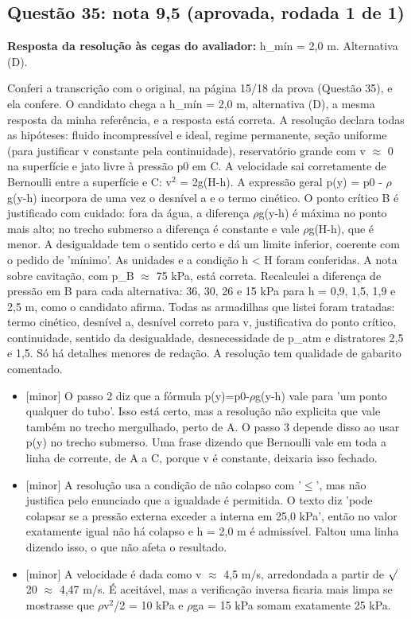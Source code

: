 \documentclass{article}%
\begin{document}
\subsection*{Questão 35: nota 9,5 (aprovada, rodada 1 de 1)}%
\textbf{Resposta da resolução às cegas do avaliador:} h\_mín = 2,0 m. Alternativa (D).\par %
Conferi a transcrição com o original, na página 15/18 da prova (Questão 35), e ela confere. O candidato chega a h\_mín = 2,0 m, alternativa (D), a mesma resposta da minha referência, e a resposta está correta. A resolução declara todas as hipóteses: fluido incompressível e ideal, regime permanente, seção uniforme (para justificar v constante pela continuidade), reservatório grande com v $\approx$ 0 na superfície e jato livre à pressão p0 em C. A velocidade sai corretamente de Bernoulli entre a superfície e C: v$^2$ = 2g(H-h). A expressão geral p(y) = p0 - $\rho$g(y-h) incorpora de uma vez o desnível a e o termo cinético. O ponto crítico B é justificado com cuidado: fora da água, a diferença $\rho$g(y-h) é máxima no ponto mais alto; no trecho submerso a diferença é constante e vale $\rho$g(H-h), que é menor. A desigualdade tem o sentido certo e dá um limite inferior, coerente com o pedido de 'mínimo'. As unidades e a condição h < H foram conferidas. A nota sobre cavitação, com p\_B $\approx$ 75 kPa, está correta. Recalculei a diferença de pressão em B para cada alternativa: 36, 30, 26 e 15 kPa para h = 0,9, 1,5, 1,9 e 2,5 m, como o candidato afirma. Todas as armadilhas que listei foram tratadas: termo cinético, desnível a, desnível correto para v, justificativa do ponto crítico, continuidade, sentido da desigualdade, desnecessidade de p\_atm e distratores 2,5 e 1,5. Só há detalhes menores de redação. A resolução tem qualidade de gabarito comentado.%
\begin{itemize}%
\item%
{[}minor{]} O passo 2 diz que a fórmula p(y)=p0-$\rho$g(y-h) vale para 'um ponto qualquer do tubo'. Isso está certo, mas a resolução não explicita que vale também no trecho mergulhado, perto de A. O passo 3 depende disso ao usar p(y) no trecho submerso. Uma frase dizendo que Bernoulli vale em toda a linha de corrente, de A a C, porque v é constante, deixaria isso fechado.%
\item%
{[}minor{]} A resolução usa a condição de não colapso com '$\leq$', mas não justifica pelo enunciado que a igualdade é permitida. O texto diz 'pode colapsar se a pressão externa exceder a interna em 25,0 kPa', então no valor exatamente igual não há colapso e h = 2,0 m é admissível. Faltou uma linha dizendo isso, o que não afeta o resultado.%
\item%
{[}minor{]} A velocidade é dada como v $\approx$ 4,5 m/s, arredondada a partir de $\surd$20 $\approx$ 4,47 m/s. É aceitável, mas a verificação inversa ficaria mais limpa se mostrasse que $\rho$v$^2$/2 = 10 kPa e $\rho$ga = 15 kPa somam exatamente 25 kPa.%
\end{itemize}%
\end{document}
